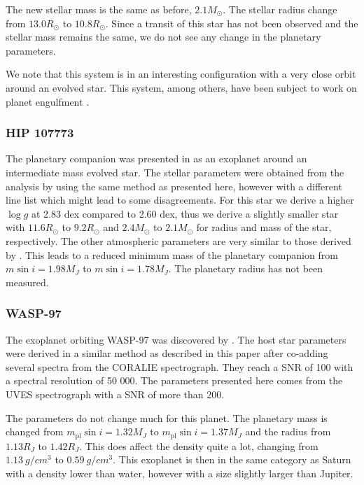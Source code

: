\documentclass{aa}
\begin{document}
The new stellar mass is the same as before, $2.1M_\odot$. The stellar radius
change from $13.0R_\odot$ to $10.8R_\odot$. Since a transit of this star has not
been observed and the stellar mass remains the same, we do not see any change in
the planetary parameters.

We note that this system is in an interesting configuration with a very close
orbit around an evolved star. This system, among others, have been subject
to work on planet engulfment \citep[see e.g.][]{Kunitomo2011}.


\subsubsection{HIP 107773}
\label{sub:HIP_107773}
The planetary companion was presented in \citet{Jones2015} as an exoplanet
around an intermediate mass evolved star. The stellar parameters were obtained
from the analysis by \citet{Jones2011} using the same method as presented here,
however with a different line list which might lead to some disagreements. For
this star we derive a higher $\log g$ at 2.83 dex compared to 2.60 dex, thus we
derive a slightly smaller star with $11.6R_\odot$ to $9.2R_\odot$ and
$2.4M_\odot$ to $2.1M_\odot$ for radius and mass of the star, respectively. The
other atmospheric parameters are very similar to those derived by
\citet{Jones2011}. This leads to a reduced minimum mass of the planetary
companion from $m\sin i=1.98M_J$ to $m\sin i=1.78M_J$. The planetary radius has
not been measured.



\subsubsection{WASP-97}
\label{sub:WASP-97}
The exoplanet orbiting WASP-97 was discovered by \citet{Hellier2014}. The host
star parameters were derived in a similar method as described in this paper
after co-adding several spectra from the CORALIE spectrograph. They reach a
SNR of 100 with a spectral resolution of 50 000. The parameters presented here
comes from the UVES spectrograph with a SNR of more than 200.

The parameters do not change much for this planet. The planetary mass is changed
from $m_\mathrm{pl}\sin i=1.32M_J$ to $m_\mathrm{pl}\sin i=1.37M_J$ and the
radius from $1.13R_J$ to $1.42R_J$. This does affect the density quite a lot,
changing from $\SI{1.13}{g/cm^3}$ to $\SI{0.59}{g/cm^3}$. This exoplanet is then
in the same category as Saturn with a density lower than water, however with a
size slightly larger than Jupiter.
\end{document}
